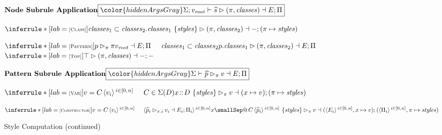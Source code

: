 \documentclass[acmsmall, screen]{acmart}
\makeatletter
\newcommand{\set}[1]{\{#1\}}
\newcommand{\varDataCon}{C}
\newcommand{\varPat}{p}
\newcommand{\varAttrs}{\mathit{styles}}
\newcommand{\varClasses}{\mathit{classes}}
\newcommand{\varTypeCon}{D}
\newcommand{\varTypeContext}{\Sigma} \newcommand{\varVar}{x}
\newcommand{\varVal}{v}
\newcommand{\varEnv}{E}
\newcommand{\varPath}{\pi}
\newcommand{\varNodeRule}{\widehat{\varNodeSelector}}
\newcommand{\varPatternRule}{\widehat{\varPat}}
\newcommand{\varEnvStyles}
{\Pi}
\newcommand{\smallSep}
  {\hspace{0.02in}}
\newcommand{\sepPremise}{\hspace{0.20in}}
\newcommand{\hsepRule}{\hspace{0.20in}}
\newcommand{\vsepRuleHeight}{0.12in}
\newcommand{\vsepRule}{\vspace{\vsepRuleHeight}}
\newcommand{\dataApp}[2]{#1\smallSep#2}
\newcommand{\emptyEnv}{-}
\newcommand{\envBind}[2]{#1 \mapsto #2}
\newcommand{\envExtend}[2]{#1, #2}
\newcommand{\valRoot}{\varVal_{\mathit{root}}}
\newcommand{\namedPattern}[2]{#1\smallSep@\smallSep#2}
\newcommand{\hasType}[2]{#1\!::\!#2}
\newcommand{\patSelector}[2]{{#1}{#2}}
\newcommand{\varPattern}[2]{\hasType{#1}{#2}}
\newcommand{\rangeZeroN}[3]
{\langle#3\rangle\smallSep^{#1 \in [0,\hspace{0.01in}#2]}}
\newcommand{\topSelector}{\top}
\newcommand{\nodeRule}[2]{#1\ \set{#2}}
\newcommand{\andStyles}[2]{\nodeRule{#1}{#2}}
\newcommand{\JudgementBox}[1]{{
\fbox{\ensuremath{#1}}
}}
\newcommand{\relDescription}[1]{\ensuremath{\textrm{\textbf{#1}}}}
\newcommand{\judgementHead}[2]
  {\ensuremath{\relDescription{#1}\hfill\JudgementBox{#2}}}
\newcommand{\ruleNameFig}[1]{\textsc{\begin{scriptsize}[#1]\end{scriptsize}}}
\newcommand{\patternMatch}[5]{#3 \rhd_{#1} #2 \dashv #4;#5}
\newcommand{\selectorMatch}[5]{#3 \rhd (#1,#2) \dashv #4;#5}
\newcommand{\hiddenArgs}[1]{\ensuremath{{\color{hiddenArgsGray}#1\vdash\ }}}
\newcommand{\hiddenArgsTwo}[2]{\ensuremath{{\color{hiddenArgsGray}#1;#2\vdash\ }}}
\makeatother
\begin{document}
\begin{figure}[h]
\judgementHead
{Node Subrule Application}
  {\hiddenArgsTwo{\varTypeContext}{\valRoot}
   \selectorMatch{\varPath}{\varClasses}{\varNodeRule}{\varEnv}{\varEnvStyles}}

\vsepRule

$
\inferrule*[lab=\ruleNameFig{Class}]
  {\varClasses_1 \subset \varClasses_2
  }
  {\selectorMatch
{\varPath}
    {\varClasses_2}
    {\andStyles{.\varClasses_1}{\varAttrs}}
    {\emptyEnv}
    {(\envBind{\varPath}{\varAttrs})}}
$


\vsepRule
$
\inferrule*[lab=\ruleNameFig{Pattern}]
{\patternMatch{\varPath}{\varPath\valRoot}{\varPat}{\varEnv}{\varEnvStyles}
   \sepPremise
   \varClasses_1 \subset \varClasses_2
  }
  {\selectorMatch
{\varPath}
    {\varClasses_2}
    {\patSelector{\varPat}{.\varClasses_1}}
    {\varEnv}
    {\varEnvStyles}}
$
\hsepRule
$
\inferrule*[lab=\ruleNameFig{Top}]
  {
  }
  {\selectorMatch{\varPath}{\varClasses}{\topSelector}{\emptyEnv}{\emptyEnv}}
$

\vsepRule

\judgementHead
  {Pattern Subrule Application}
  {\hiddenArgs{\varTypeContext}
   \patternMatch{\varPath}{\varVal}{\varPatternRule}{\varEnv}{\varEnvStyles}}

\vsepRule

$
\inferrule*[lab=\ruleNameFig{Var}]
  {\varVal = \dataApp{\varDataCon}{\rangeZeroN{i}{n}{\varVal_i}}
   \sepPremise
\varDataCon \in \varTypeContext(\varTypeCon)
  }
  {\patternMatch
    {\varPath}
    {\varVal}
    {\andStyles{\varPattern{\varVar}{\varTypeCon}}{\varAttrs}}
    {(\envBind{\varVar}{\varVal})}
    {(\envBind{\varPath}{\varAttrs})}}
$


\vsepRule

$
\inferrule*[lab=\ruleNameFig{Constructor}]
  {\varVal = \dataApp{\varDataCon}{\rangeZeroN{i}{n}{\varVal_i}}
   \sepPremise
   \rangeZeroN{i}{n}{\patternMatch{\varPath.i}
                                  {\varVal_i}
                                  {\varPatternRule_i}
                                  {\varEnv_i}
                                  {\varEnvStyles_i}}
  }
  {\patternMatch
    {\varPath}
    {\varVal}
    {\andStyles
      {\namedPattern{\varVar}{\dataApp{\varDataCon}{\rangeZeroN{i}{n}{\varPatternRule_i}}}}
      {\varAttrs}}
      {(\envExtend{\rangeZeroN{i}{n}{\varEnv_i}}{\envBind{\varVar}{\varVal}})}
      {(\envExtend{\rangeZeroN{i}{n}{\varEnvStyles_i}}{\envBind{\varPath}{\varAttrs}})}
  }
$


\vsepRule

\caption{Style Computation (continued)}
\label{fig:style-computation-two}
\end{figure}
\end{document}
